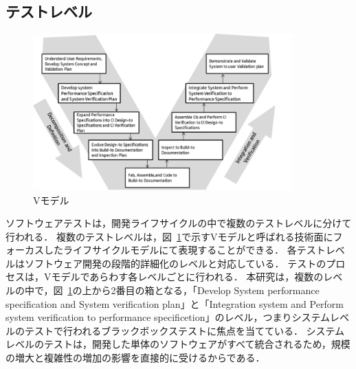 \documentclass[a4paper,11pt]{jreport}
\begin{document}
\subsection{テストレベル}

\begin{figure}[htbp]
  \begin{center}
  \includegraphics[width=10cm]{./image/D-2-Fig1.png}
  \caption{Vモデル}
  \label{fig:D-2-Fig1}
  \end{center}
\end{figure}
ソフトウェアテストは，開発ライフサイクルの中で複数のテストレベルに分けて行われる．
複数のテストレベルは，図~\ref{fig:D-2-Fig1}で示すVモデルと呼ばれる技術面にフォーカスしたライフサイクルモデルにて表現することができる\cite{forsberg1991}．
各テストレベルはソフトウェア開発の段階的詳細化のレベルと対応している．
テストのプロセスは，Vモデルであらわす各レベルごとに行われる．
本研究は，複数のレベルの中で，図~\ref{fig:D-2-Fig1}の上から2番目の箱となる，「Develop System performance specification and System verification plan」と「Integration system and Perform system verification to performance specificetion」のレベル，つまりシステムレベルのテストで行われるブラックボックステストに焦点を当てている．
システムレベルのテストは，開発した単体のソフトウェアがすべて統合されるため，規模の増大と複雑性の増加の影響を直接的に受けるからである．
\end{document}
